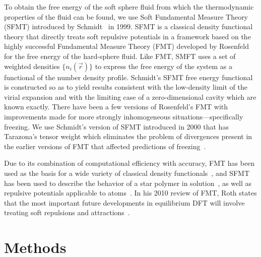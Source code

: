 \documentclass[letterpaper,twocolumn,amsmath,amssymb,prb]{revtex4-1}
\begin{document}
To obtain the free energy of the soft sphere fluid from which the
thermodynamic properties of the fluid can be found, 
we use Soft Fundamental Measure Theory
(SFMT) introduced by Schmidt~\cite{schmidt1999density} in 1999.
SFMT is a classical density functional
theory that directly treats soft repulsive potentials in a framework
based on the highly successful Fundamental Measure Theory (FMT) developed
by Rosenfeld~\cite{rosenfeld1989} for the free energy of the hard-sphere fluid.
Like FMT, SMFT uses a set of weighted densities $\lbrace{n_i(\vec r)\rbrace}$ 
to express the free energy of the system
as a functional of the number density profile.
Schmidt's SFMT free energy functional is constructed so as to yield results 
consistent with the low-density limit of the virial expansion
and with the limiting case of a zero-dimensional cavity which are known 
exactly. 
There have been a few versions of Rosenfeld's FMT with improvements 
made for more strongly inhomogeneous situations---specifically freezing.
We use Schmidt's version of SFMT introduced in 2000 that
has Tarazona's tensor weight which eliminates the problem of divergences 
present in the earlier versions of FMT that affected predictions of
freezing~\cite{schmidt2000fluid,tarazona2000}.

Due to its combination of computational efficiency with accuracy, 
FMT has been used as the
basis for a wide variety of classical density
functionals~\cite{cuesta1997dimensional, hansen2009fundamental,
  marechal2013density, hughes2013classical, krebs2014improved}, and
SFMT has been used to describe the behavior of a star polymer in
solution~\cite{schmidt2000density, groh2001density, kim2001adsorption,
  sweatman2002fundamental}, as well as repulsive potentials applicable
to atoms~\cite{schmidt2000fluid, sweatman2002fundamental}.
In his 2010 review of FMT, Roth states that the most important future
developments in equilibrium DFT will involve treating soft repulsions
and attractions~\cite{roth2010fundamental}.

\section{Methods}
\end{document}
